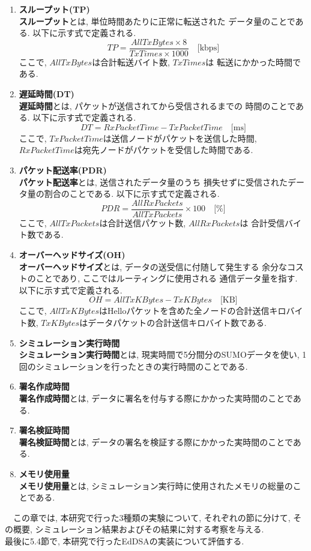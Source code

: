 \begin{enumerate}
  \item \textbf{スループット(TP)}\\
  \indent \textbf{スループット}とは, 単位時間あたりに正常に転送された
  データ量のことである. 以下に示す式で定義される. 
  \[
    TP = \frac{AllTxBytes\times 8}{TxTimes\times 1000} \quad \text{[kbps]}
  \]
  ここで, $AllTxBytes$は合計転送バイト数, $TxTimes$は
  転送にかかった時間である. 
  \item \textbf{遅延時間(DT)}\\
  \indent \textbf{遅延時間}とは, パケットが送信されてから受信されるまでの
  時間のことである. 以下に示す式で定義される. 
  \[
    DT = RxPacketTime - TxPacketTime \quad \text{[ms]}
  \]
  ここで,
  $TxPacketTime$は送信ノードがパケットを送信した時間, 
  $RxPacketTime$は宛先ノードがパケットを受信した時間である. 
  \item \textbf{パケット配送率(PDR)}\\
  \indent \textbf{パケット配送率}とは, 送信されたデータ量のうち
  損失せずに受信されたデータ量の割合のことである. 以下に示す式で定義される. 
  \[
    PDR = \frac{AllRxPackets}{AllTxPackets} \times 100 \quad \text{[\%]}
  \]
  ここで, $AllTxPackets$は合計送信パケット数, $AllRxPackets$は
  合計受信バイト数である. 
  \item \textbf{オーバーヘッドサイズ(OH)}\\
  \indent \textbf{オーバーヘッドサイズ}とは, データの送受信に付随して発生する
  余分なコストのことであり, ここではルーティングに使用される
  通信データ量を指す. 以下に示す式で定義される. 
  \[
    OH = AllTxKBytes - TxKBytes \quad \text{[KB]}
  \]
  ここで, 
  $AllTxKBytes$はHelloパケットを含めた全ノードの合計送信キロバイト数, 
  $TxKBytes$はデータパケットの合計送信キロバイト数である. 
  \item \textbf{シミュレーション実行時間}\\
  \indent \textbf{シミュレーション実行時間}とは, 現実時間で5分間分のSUMOデータを使い, 
  1回のシミュレーションを行ったときの実行時間のことである. 
  \item \textbf{署名作成時間}\\
  \indent \textbf{署名作成時間}とは, データに署名を付与する際にかかった実時間のことである. 
  \item \textbf{署名検証時間}\\
  \indent \textbf{署名検証時間}とは, データの署名を検証する際にかかった実時間のことである.
  \item \textbf{メモリ使用量}\\
  \indent \textbf{メモリ使用量}とは, シミュレーション実行時に使用されたメモリの総量のことである.
\end{enumerate}
\vspace{0.5em}
\indent 　この章では, 本研究で行った3種類の実験について, それぞれの節に分けて, その概要, 
シミュレーション結果およびその結果に対する考察を与える. \\
\indent 最後に5.4節で, 本研究で行ったEdDSAの実装について評価する. 

